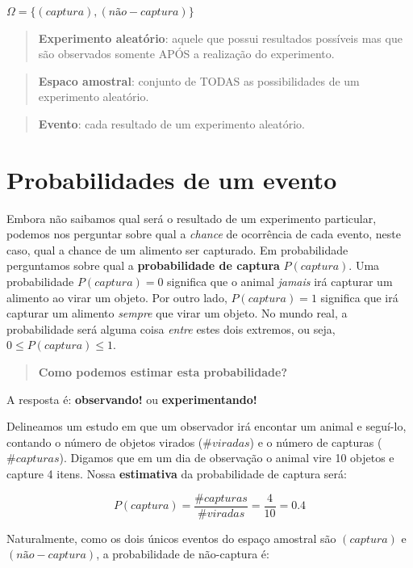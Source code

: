 \documentclass[
]{book}
\begin{document}
\(\Omega = \{(captura), (não-captura)\}\)

\begin{quote}
\textbf{Experimento aleatório}: aquele que possui resultados possíveis mas que são observados somente APÓS a realização do experimento.
\end{quote}

\begin{quote}
\textbf{Espaco amostral}: conjunto de TODAS as possibilidades de um experimento aleatório.
\end{quote}

\begin{quote}
\textbf{Evento}: cada resultado de um experimento aleatório.
\end{quote}

\hypertarget{probabilidades-de-um-evento}{%
\section{Probabilidades de um evento}\label{probabilidades-de-um-evento}}

Embora não saibamos qual será o resultado de um experimento particular, podemos nos perguntar sobre qual a \emph{chance} de ocorrência de cada evento, neste caso, qual a chance de um alimento ser capturado. Em probabilidade perguntamos sobre qual a \textbf{probabilidade de captura} \(P(captura)\). Uma probabilidade \(P(captura) = 0\) significa que o animal \emph{jamais} irá capturar um alimento ao virar um objeto. Por outro lado, \(P(captura) = 1\) significa que irá capturar um alimento \emph{sempre} que virar um objeto. No mundo real, a probabilidade será alguma coisa \emph{entre} estes dois extremos, ou seja, \(0 \le P(captura) \le 1\).

\begin{quote}
\textbf{Como podemos estimar esta probabilidade?}
\end{quote}

A resposta é: \textbf{observando!} ou \textbf{experimentando!}

Delineamos um estudo em que um observador irá encontar um animal e seguí-lo, contando o número de objetos virados (\(\#viradas\)) e o número de capturas (\(\#capturas\)). Digamos que em um dia de observação o animal vire 10 objetos e capture 4 itens. Nossa \textbf{estimativa} da probabilidade de captura será:

\[P(captura) = \frac{\#capturas}{\#viradas} = \frac{4}{10} = 0.4\]

Naturalmente, como os dois únicos eventos do espaço amostral são \((captura)\) e \((não-captura)\), a probabilidade de não-captura é:
\end{document}
